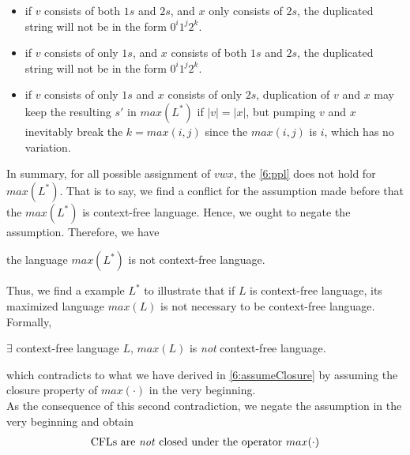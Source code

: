\documentclass[11pt,a4paper]{article}
\newcommand{\htab}{\hspace*{0.63cm}}
\newcommand{\pg}{\\[0.3cm]}
\newcommand{\LL}{L^{*}}
\begin{document}
\begin{itemize}
\begin{itemize}
        \item{if $v$ consists of both $1s$ and $2s$, and $x$ only consists of $2s$, the duplicated string will not be in the form $0^{i}1^{j}2^{k}$.}
        \item{if $v$ consists of only $1s$, and $x$ consists of both $1s$ and $2s$, the duplicated string will not be in the form $0^{i}1^{j}2^{k}$.}
        \item{if $v$ consists of only $1s$ and $x$ consists of only $2s$, duplication of $v$ and $x$ may keep the resulting $s'$ in $max(\LL)$ if $|v| = |x|$, but pumping $v$ and $x$ inevitably break the $k = max(i,j)$ since the $max(i,j)$ is $i$, which has no variation.}
    \end{itemize}   
\end{itemize}
\htab In summary, for all possible assignment of $vwx$, the \eqref{6:ppl} does not hold for $max(\LL)$. That is to say, we find a conflict for the assumption made before that the $max(\LL)$ is context-free language. Hence, we ought to negate the assumption. Therefore, we have 
\begin{center}
    the language $max(\LL)$ is not context-free language.
    \end{center}
\htab Thus, we find a example $\LL$ to illustrate that if $L$ is context-free language, its maximized language $max(L)$ is not necessary to be context-free language. Formally,
\begin{center}
    $\exists$ context-free language $L$, $max(L)$ is \textit{not} context-free language.\\[0.2cm]
    \end{center}
\htab which contradicts to what we have derived in \eqref{6:assumeClosure} 
    by assuming the closure property of $max(\cdot)$ in the very beginning. \pg
\htab As the consequence of this second contradiction, we negate the assumption in the very beginning and obtain
\begin{align}
    \text{CFLs are \textit{not} closed under the operator } max(\cdot) 
    \end{align}
\newpage
\end{document}
